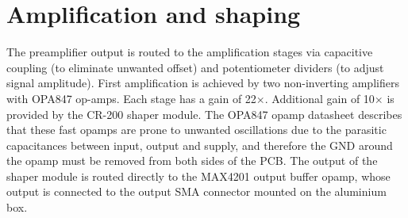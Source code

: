 \section{Amplification and shaping}
The preamplifier output is routed to the amplification stages via capacitive coupling (to eliminate unwanted offset) and potentiometer dividers (to adjust signal amplitude). First amplification is achieved by two non-inverting amplifiers with OPA847 op-amps. Each stage has a gain of 22$\times$. Additional gain of 10$\times$ is provided by the CR-200 shaper module. The OPA847 opamp datasheet \cite{OPA847} describes that these fast opamps are prone to unwanted oscillations due to the parasitic capacitances between input, output and supply, and therefore the GND around the opamp must be removed from both sides of the PCB. The output of the shaper module is routed directly to the MAX4201 output buffer opamp, whose output is connected to the output SMA connector mounted on the aluminium box.


